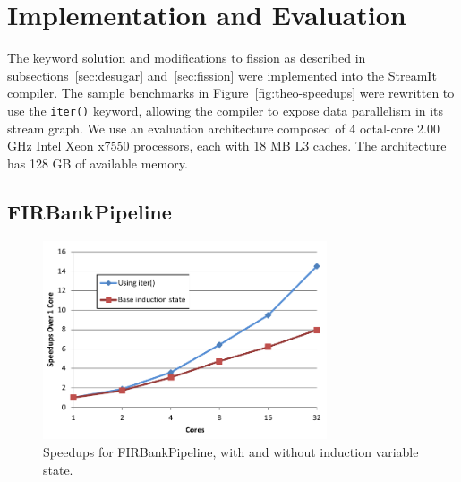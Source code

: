\section{Implementation and Evaluation}
\label{sec:analysis}

The keyword solution and modifications to fission as described in subsections~\ref{sec:desugar} and~\ref{sec:fission} were implemented into the StreamIt compiler.  The sample benchmarks in Figure~\ref{fig:theo-speedups} were rewritten to use the {\tt iter()} keyword, allowing the compiler to expose data parallelism in its stream graph.  We use an evaluation architecture composed of 4 octal-core 2.00 GHz Intel Xeon x7550 processors, each with 18 MB L3 caches.  The architecture has 128 GB of available memory.






\subsection{FIRBankPipeline}
\begin{figure}[t]
\includegraphics[width=3.3in]{figures/firbank-results.pdf}
\caption{Speedups for FIRBankPipeline, with and without induction variable state.  \protect\label{fig:firbank-results}}
\end{figure}

